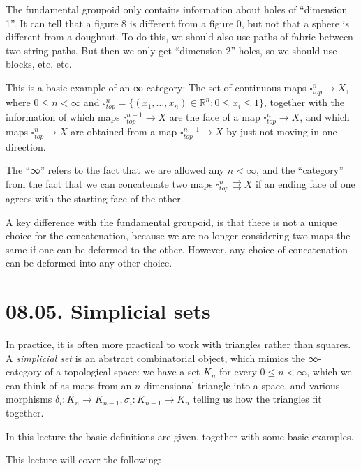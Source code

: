 \documentclass[a4paper]{amsart}
\numberwithin{figure}{section}
\theoremstyle{theorem}
\theoremstyle{definition}
\newcommand{\RR}{\mathbb{R}}
\begin{document}
The fundamental groupoid only contains information about holes of ``dimension 1''. It can tell that a figure 8 is different from a figure 0, but not that a sphere is different from a doughnut. To do this, we should also use paths of fabric between two string paths. But then we only get ``dimension 2'' holes, so we should use blocks, etc, etc. 

This is a basic example of an ∞-category: The set of continuous maps $\square^n_{top} \to X$, where $0 \leq n < \infty$ and $\square^n_{top} = \{ (x_1, \dots, x_n) \in \RR^n : 0 \leq x_i \leq 1 \}$, together with the information of which maps $\square^{n-1}_{top} {\to} X$ are the face of a map $\square^n_{top} {\to} X$, and which maps $\square^n_{top} {\to} X$ are obtained from a map $\square^{n-1}_{top} {\to} X$ by just not moving in one direction.

The ``∞'' refers to the fact that we are allowed any $n < \infty$, and the ``category'' from the fact that we can concatenate two maps $\square^n_{top} {\rightrightarrows} X$ if an ending face of one agrees with the starting face of the other.

A key difference with the fundamental groupoid, is that there is not a unique choice for the concatenation, because we are no longer considering two maps the same if one can be deformed to the other. However, any choice of concatenation can be deformed into any other choice. 



\section{08.05. Simplicial sets}

In practice, it is often more practical to work with triangles rather than squares. A \emph{simplicial set} is an abstract combinatorial object, which mimics the ∞-category of a topological space: we have a set $K_n$ for every $0 \leq n < \infty$, which we can think of as maps from an $n$-dimensional triangle into a space, and various morphisms $\delta_i: K_n \to K_{n-1}, \sigma_i: K_{n-1} \to K_n$ telling us how the triangles fit together.

In this lecture the basic definitions are given, together with some basic examples.

This lecture will cover the following: 
\end{document}
